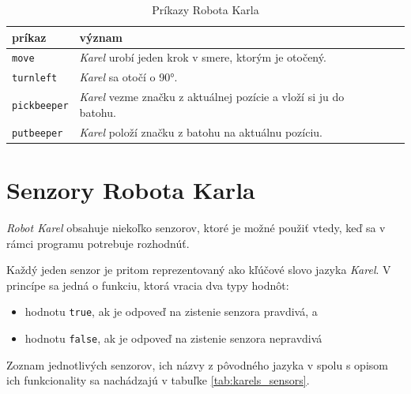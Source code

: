 \begin{table}[!ht]
	\caption{Príkazy Robota Karla}\label{tab:karels_primitives}
	\smallskip
	\centering

	\begin{tabular}{llll}
		\toprule
		príkaz & význam \\
		\midrule

		\verb|move| & \emph{Karel} urobí jeden krok v smere, ktorým je otočený. \\
		\verb|turnleft| & \emph{Karel} sa otočí o 90°. \\
		\verb|pickbeeper| & \emph{Karel} vezme značku z aktuálnej pozície a vloží si ju do batohu. \\
		\verb|putbeeper| & \emph{Karel} položí značku z batohu na aktuálnu pozíciu. \\
		\bottomrule
	\end{tabular}
\end{table}


\section{Senzory Robota Karla}

\emph{Robot Karel} obsahuje niekoľko senzorov, ktoré je možné použiť vtedy, keď sa v rámci programu potrebuje rozhodnúť.

Každý jeden senzor je pritom reprezentovaný ako kľúčové slovo jazyka \emph{Karel}. V princípe sa jedná o funkciu, ktorá vracia dva typy hodnôt:

\begin{itemize}
    \item hodnotu \verb|true|, ak je odpoveď na zistenie senzora pravdivá, a
    \item hodnotu \verb|false|, ak je odpoveď na zistenie senzora nepravdivá
\end{itemize}

Zoznam jednotlivých senzorov, ich názvy z pôvodného jazyka v \cite{Pattis1994} spolu s opisom ich funkcionality sa nachádzajú v tabuľke \ref{tab:karels_sensors}.

